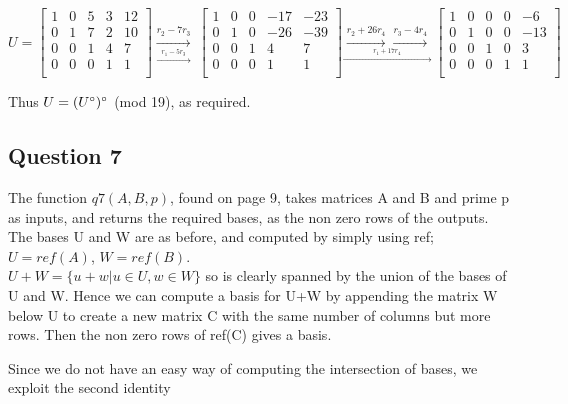 \documentclass[10pt,a4paper]{report}
\begin{document}
\begin{equation*}
U=\begin{bmatrix}
1 & 0 & 5 & 3 & 12 \\
0 & 1 & 7 & 2 & 10\\
0 & 0 & 1 & 4 & 7\\
0 & 0 & 0 & 1 & 1\\
\end{bmatrix} \underset{\overset{r_1-5r_3}{\longrightarrow}}{\overset{r_2-7r_3}{\longrightarrow}}\
\begin{bmatrix}
1 & 0 & 0 & -17 & -23 \\
0 & 1 & 0 & -26 & -39\\
0 & 0 & 1 & 4 & 7\\
0 & 0 & 0 & 1 & 1\\
\end{bmatrix}\underset{\overset{r_1+17r_4}{\longrightarrow}}{\overset{r_2+26r_4}{\longrightarrow}{\overset{r_3-4r_4}{\longrightarrow}}}\
\begin{bmatrix}
1 & 0 & 0 & 0 & -6 \\
0 & 1 & 0 & 0 & -13\\
0 & 0 & 1 & 0 & 3\\
0 & 0 & 0 & 1 & 1\\
\end{bmatrix}
\end{equation*}

\vspace{5mm}

Thus $U=(U\degree)\degree$ (mod 19), as required.


\subsection*{Question 7}

The function $q7(A,B,p)$, found on page 9, takes matrices A and B and prime p as inputs, and returns the required bases, as the non zero rows of the outputs. The bases U and W are as before, and computed by simply using ref; $U=ref(A)$, $W=ref(B)$.\\

$U+W=\{u+w | u \in U, w \in W\}$ so is clearly spanned by the union of the bases of U and W. Hence we can compute a basis for U+W by appending the matrix W below U to create a new matrix C with the same number of columns but more rows. Then the non zero rows of ref(C) gives a basis. 

Since we do not have an easy way of computing the intersection of bases, we exploit the second identity 
\end{document}

